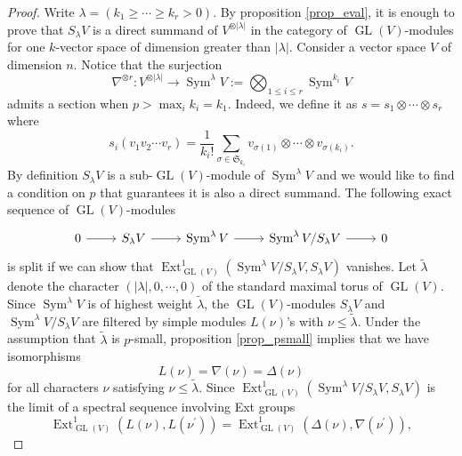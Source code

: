 \documentclass[11pt]{amsart}
\numberwithin{subsection}{section}
\numberwithin{figure}{section}
\numberwithin{table}{section}
\theoremstyle{1}
\theoremstyle{2}
\DeclareMathOperator{\Ext}{Ext}
\DeclareMathOperator{\GL}{GL}
\DeclareMathOperator{\Sym}{Sym}
\begin{document}
\begin{proof}
Write $\lambda = (k_1 \geq \cdots \geq k_r > 0)$. By proposition \ref{prop_eval}, it is enough to prove that $S_{\lambda}V$ is a direct summand of $V^{\otimes |\lambda |}$ in the category of $\GL(V)$-modules for one $k$-vector space of dimension greater than $|\lambda |$. Consider a vector space $V$ of dimension $n$. Notice that the surjection
\begin{equation*}
\nabla^{\otimes r} : V^{\otimes  |\lambda |} \rightarrow \Sym^{\lambda} V := \bigotimes_{1 \leq i \leq r} \Sym^{k_i} V
\end{equation*}
admits a section when $p > \max_i k_i = k_1$. Indeed, we define it as $s = s_1 \otimes \cdots \otimes s_r$ where
\begin{equation*}
s_i(v_1v_2\cdots v_r) = \frac{1}{k_i!}\sum_{\sigma \in \mathfrak{S}_{k_i}}v_{\sigma(1)}\otimes \cdots \otimes v_{\sigma(k_i)}.
\end{equation*}
By definition $S_{\lambda}V$ is a sub-$\GL(V)$-module of $\Sym^{\lambda} V$ and we would like to find a condition on $p$ that guarantees it is also a direct summand. The following exact sequence of $\GL(V)$-modules
\begin{equation*}
\begin{tikzcd}
0 \arrow[r] & S_{\lambda}V \arrow[r] & \Sym^{\lambda} V \arrow[r] & \Sym^{\lambda} V/S_{\lambda}V \arrow[r] & 0
\end{tikzcd}
\end{equation*}
is split if we can show that $\Ext^1_{\GL(V)}(\Sym^{\lambda} V/S_{\lambda}V,S_{\lambda}V)$ vanishes. Let $\tilde{\lambda}$ denote the character $(|\lambda |, 0, \cdots, 0)$ of the standard maximal torus of $\GL(V)$. Since $\Sym^{\lambda}V$ is of highest weight $\tilde{\lambda}$, the $\GL(V)$-modules $S_{\lambda}V$ and $\Sym^{\lambda} V/S_{\lambda}V$ are filtered by simple modules $L(\nu)$'s with $\nu \leq \tilde{\lambda}$. Under the assumption that $\tilde{\lambda}$ is $p$-small, proposition \ref{prop_psmall} implies that we have isomorphisms
\begin{equation*}
L(\nu) = \nabla(\nu) = \Delta(\nu)
\end{equation*}
for all characters $\nu$ satisfying $\nu \leq \tilde{\lambda}$. Since $\Ext^1_{\GL(V)}(\Sym^{\lambda} V/S_{\lambda}V,S_{\lambda}V)$ is the limit of a spectral sequence involving Ext groups
\begin{equation*}
\Ext^1_{\GL(V)}(L(\nu),L(\nu^\prime)) = \Ext^1_{\GL(V)}(\Delta(\nu),\nabla(\nu^\prime)),
\end{equation*}

\end{proof}
\end{document}
